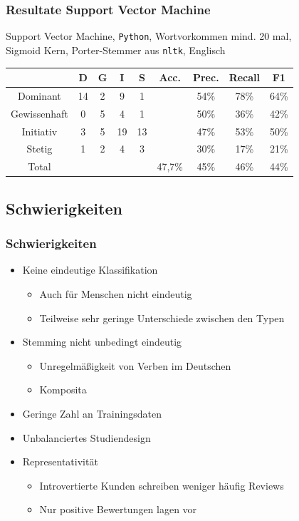 \begin{frame}
\frametitle{Resultate Support Vector Machine}
\begin{center}
Support Vector Machine, \texttt{Python}, Wortvorkommen mind. 20 mal,\\
Sigmoid Kern, Porter-Stemmer aus \texttt{nltk}, Englisch

\bigskip

\begin{tabular}{|c|c|c|c|c|c|c|c|c|}
\hline
				& D 	& G	& I & S	& Acc.	& Prec. & Recall	& F1\\
\hline
Dominant 		& 14		& 2 			& 9 		& 1 		&       	& 54\%	 	& 78\%	 	& 64\%\\
Gewissenhaft 	& 0 		& 5 			& 4 		& 1 		& 			& 50\%	 	& 36\%	 	& 42\%\\
Initiativ 		& 3 		& 5				& 19		& 13		& 			& 47\%		& 53\%	 	& 50\%\\
Stetig 			& 1 		& 2 			& 4 		& 3 		& 			& 30\%	   	& 17\%	 	& 21\%\\
\hline
Total 			& 			& 				& 			& 			& 47,7\%		& 45\%		& 46\%  	& 44\%\\
\hline
\end{tabular}
\end{center}
\end{frame}
\subsection{Schwierigkeiten}
\begin{frame}
\frametitle{Schwierigkeiten}
\begin{itemize}
	\item Keine eindeutige Klassifikation
	\begin{itemize}
		\item Auch für Menschen nicht eindeutig
		\item Teilweise sehr geringe Unterschiede zwischen den Typen
	\end{itemize}
	\item Stemming nicht unbedingt eindeutig
	\begin{itemize}
		\item Unregelmäßigkeit von Verben im Deutschen
		\item Komposita
	\end{itemize}
	\item Geringe Zahl an Trainingsdaten
	\item Unbalanciertes Studiendesign
	\item Representativität
	\begin{itemize}
		\item Introvertierte Kunden schreiben weniger häufig Reviews
		\item Nur positive Bewertungen lagen vor
	\end{itemize}
\end{itemize}
\end{frame}